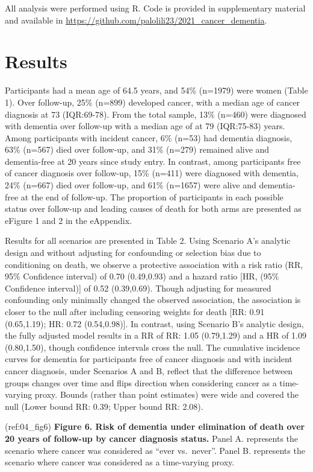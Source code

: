 \documentclass[
]{book}
\begin{document}
All analysis were performed using R. Code is provided in supplementary material and available in \url{https://github.com/palolili23/2021_cancer_dementia}.

\hypertarget{results-2}{%
\section{Results}\label{results-2}}

Participants had a mean age of 64.5 years, and 54\% (n=1979) were women (Table 1). Over follow-up, 25\% (n=899) developed cancer, with a median age of cancer diagnosis at 73 (IQR:69-78). From the total sample, 13\% (n=460) were diagnosed with dementia over follow-up with a median age of at 79 (IQR:75-83) years. Among participants with incident cancer, 6\% (n=53) had dementia diagnosis, 63\% (n=567) died over follow-up, and 31\% (n=279) remained alive and dementia-free at 20 years since study entry. In contrast, among participants free of cancer diagnosis over follow-up, 15\% (n=411) were diagnosed with dementia, 24\% (n=667) died over follow-up, and 61\% (n=1657) were alive and dementia-free at the end of follow-up. The proportion of participants in each possible status over follow-up and leading causes of death for both arms are presented as eFigure 1 and 2 in the eAppendix.

Results for all scenarios are presented in Table 2. Using Scenario A's analytic design and without adjusting for confounding or selection bias due to conditioning on death, we observe a protective association with a risk ratio (RR, 95\% Confidence interval) of 0.70 (0.49,0.93) and a hazard ratio {[}HR, (95\% Confidence interval){]} of 0.52 (0.39,0.69). Though adjusting for measured confounding only minimally changed the observed association, the association is closer to the null after including censoring weights for death {[}RR: 0.91 (0.65,1.19); HR: 0.72 (0.54,0.98){]}. In contrast, using Scenario B's analytic design, the fully adjusted model results in a RR of RR: 1.05 (0.79,1.29) and a HR of 1.09 (0.80,1.50), though confidence intervals cross the null. The cumulative incidence curves for dementia for participants free of cancer diagnosis and with incident cancer diagnosis, under Scenarios A and B, reflect that the difference between groups changes over time and flips direction when considering cancer as a time-varying proxy. Bounds (rather than point estimates) were wide and covered the null (Lower bound RR: 0.39; Upper bound RR: 2.08).

(ref:04\_fig6) \textbf{Figure 6. Risk of dementia under elimination of death over 20 years of follow-up by cancer diagnosis status.} Panel A. represents the scenario where cancer was considered as ``ever vs.~never''. Panel B. represents the scenario where cancer was considered as a time-varying proxy.
\end{document}
